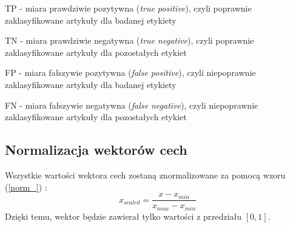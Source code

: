 \documentclass{classrep}
\begin{document}
TP - miara prawdziwie pozytywna (\textsl{true positive}), czyli poprawnie zaklasyfikowane artykuły dla badanej etykiety 

TN - miara prawdziwie negatywna (\textsl{true negative}), czyli poprawnie zaklasyfikowane artykuły dla pozostałych etykiet

FP - miara fałszywie pozytywna (\textsl{false positive}), czyli niepoprawnie zaklasyfikowane artykuły dla badanej etykiety 

FN - miara fałszywie negatywna (\textsl{false negative}), czyli niepoprawnie zaklasyfikowane artykuły dla pozostałych etykiet

\subsection{Normalizacja wektorów cech}
Wszystkie wartości wektora cech zostaną znormalizowane za pomocą wzoru (\ref{norm_}) \cite{norm}:
\begin{equation} \label{norm_} x_{scaled} = \frac{x - x_{min}}{x_{max} - x_{min}}  \end{equation}
Dzięki temu, wektor będzie zawierał tylko wartości z przedziału $[0,1]$.
\end{document}
